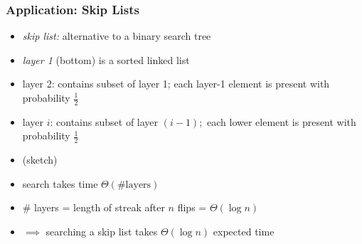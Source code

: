 \documentclass[10pt]{beamer}
\begin{document}
\begin{frame} \frametitle{Application: Skip Lists}
  \begin{itemize}
    \item \emph{skip list:} alternative to a binary search tree
    \item \emph{layer 1} (bottom) is a sorted linked list
    \item layer 2: contains subset of layer 1; each layer-1 element is present
      with probability $\frac{1}{2}$
    \item layer $i$: contains subset of layer $(i-1);$ each lower element is
      present with probability $\frac{1}{2}$
    \item (sketch)
    \item search takes time $\Theta(\text{\# layers})$
    \item \# layers = length of streak after $n$ flips = $\Theta(\log n)$
    \item $\implies$ searching a skip list takes $\Theta(\log n)$ expected time
  \end{itemize}
\end{frame}
\end{document}
